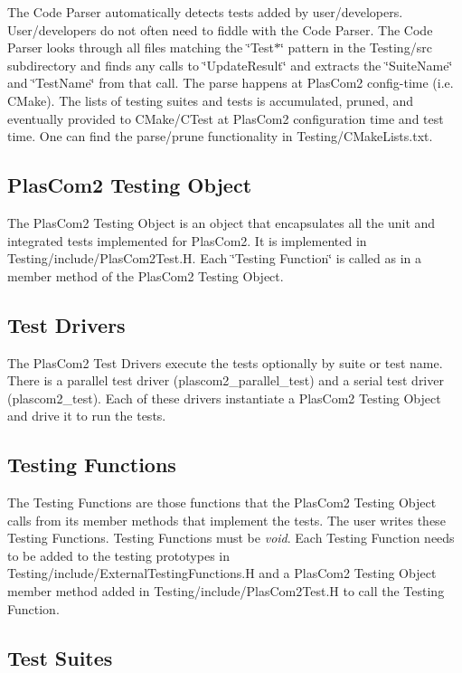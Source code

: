 The Code Parser automatically detects tests added by user/developers. User/developers do not often need to fiddle with the Code Parser. The Code Parser looks through all files matching the \char`\"{}\+Test$\ast$\char`\"{} pattern in the Testing/src subdirectory and finds any calls to \char`\"{}\+Update\+Result\char`\"{} and extracts the \char`\"{}\+Suite\+Name\char`\"{} and \char`\"{}\+Test\+Name\char`\"{} from that call. The parse happens at Plas\+Com2 config-\/time (i.\+e. C\+Make). The lists of testing suites and tests is accumulated, pruned, and eventually provided to C\+Make/\+C\+Test at Plas\+Com2 configuration time and test time. One can find the parse/prune functionality in Testing/\+C\+Make\+Lists.\+txt.\hypertarget{testing_reference_object}{}\subsection{Plas\+Com2 Testing Object}\label{testing_reference_object}
The Plas\+Com2 Testing Object is an object that encapsulates all the unit and integrated tests implemented for Plas\+Com2. It is implemented in Testing/include/\+Plas\+Com2\+Test.\+H. Each \char`\"{}\+Testing Function\char`\"{} is called as in a member method of the Plas\+Com2 Testing Object.\hypertarget{testing_reference_drivers}{}\subsection{Test Drivers}\label{testing_reference_drivers}
The Plas\+Com2 Test Drivers execute the tests optionally by suite or test name. There is a parallel test driver (plascom2\+\_\+parallel\+\_\+test) and a serial test driver (plascom2\+\_\+test). Each of these drivers instantiate a Plas\+Com2 Testing Object and drive it to run the tests.\hypertarget{testing_reference_functions}{}\subsection{Testing Functions}\label{testing_reference_functions}
The Testing Functions are those functions that the Plas\+Com2 Testing Object calls from its member methods that implement the tests. The user writes these Testing Functions. Testing Functions must be {\itshape void}. Each Testing Function needs to be added to the testing prototypes in Testing/include/\+External\+Testing\+Functions.\+H and a Plas\+Com2 Testing Object member method added in Testing/include/\+Plas\+Com2\+Test.\+H to call the Testing Function.\hypertarget{testing_reference_suites}{}\subsection{Test Suites}\label{testing_reference_suites}
